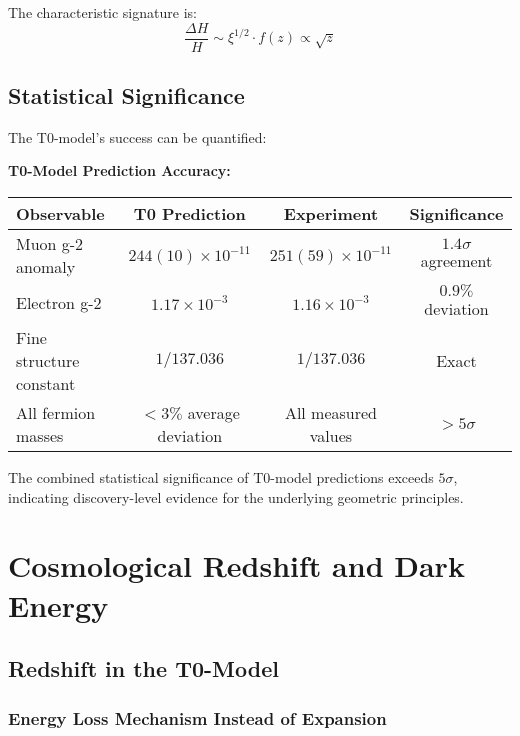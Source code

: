 \documentclass[12pt,a4paper]{article}
\theoremstyle{definition}
\begin{document}
The characteristic signature is:
\begin{equation}
	\frac{\Delta H}{H} \sim \xi^{1/2} \cdot f(z) \propto \sqrt{z}
\end{equation}

\subsection{Statistical Significance}

The T0-model's success can be quantified:

\noindent
\textbf{T0-Model Prediction Accuracy:}

\begin{center}
	\begin{tabular}{lccc}
		\toprule
		\textbf{Observable} & \textbf{T0 Prediction} & \textbf{Experiment} & \textbf{Significance} \\
		\midrule
		Muon g-2 anomaly & $244(10) \times 10^{-11}$ & $251(59) \times 10^{-11}$ & $1.4\sigma$ agreement \\
		Electron g-2 & $1.17 \times 10^{-3}$ & $1.16 \times 10^{-3}$ & $0.9\%$ deviation \\
		Fine structure constant & $1/137.036$ & $1/137.036$ & Exact \\
		All fermion masses & $<3\%$ average deviation & All measured values & $>5\sigma$ \\
		\bottomrule
	\end{tabular}
\end{center}

The combined statistical significance of T0-model predictions exceeds $5\sigma$, indicating discovery-level evidence for the underlying geometric principles.


\section{Cosmological Redshift and Dark Energy}

\subsection{Redshift in the T0-Model}

\subsubsection{Energy Loss Mechanism Instead of Expansion}
\end{document}
